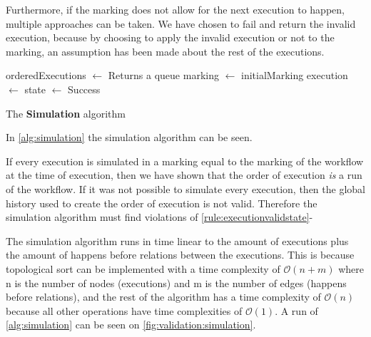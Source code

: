 	\newpar Furthermore, if the marking does not allow for the next execution to happen, multiple approaches can be taken. We have chosen to fail and return the invalid execution, because by choosing to apply the invalid execution or not to the marking, an assumption has been made about the rest of the executions.
	
	\begin{algorithm}[H]
		\begin{algorithmic}
			\State orderedExecutions $\leftarrow$  \Comment Returns a queue
			\State marking $\leftarrow$ initialMarking
				\State execution $\leftarrow$ 
					\State\Return{}
				\EndIf
				\State state $\leftarrow$ 
			\EndWhile
			\State\Return Success
			\EndFunction
		\end{algorithmic}
		\caption{The \textbf{Simulation} algorithm}
		\label{alg:simulation}
	\end{algorithm}
	
	\newpar In \autoref{alg:simulation} the simulation algorithm can be seen.
	
	If every execution is simulated in a marking equal to the marking of the workflow at the time of execution, then we have shown that the order of execution \textit{is} a run of the workflow. If it was not possible to simulate every execution, then the global history used to create the order of execution is not valid. Therefore the simulation algorithm must find violations of \autoref{rule:executionvalidstate}-
	
	\newpar The simulation algorithm runs in time linear to the amount of executions plus the amount of happens before relations between the executions. This is because topological sort can be implemented with a time complexity of $\mathcal{O}(n + m)$ where n is the number of nodes (executions) and m is the number of edges (happens before relations), and the rest of the algorithm has a time complexity of $\mathcal{O}(n)$ because all other operations have time complexities of $\mathcal{O}(1)$. A run of \autoref{alg:simulation} can be seen on \autoref{fig:validation:simulation}.
	
